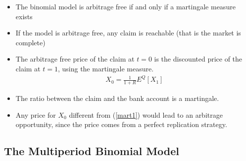 \documentclass[a4paper,10pt]{report}
\theoremstyle{plain}
\theoremstyle{definition}
\newcommand\be{\begin{eqnarray}}    %
\newcommand\ee{\end{eqnarray}}
\begin{document}
\begin{itemize}
\item The binomial model is arbitrage free if and only if a martingale measure exists
\item If the model is arbitrage free, any claim is reachable (that is the market is complete)
\item The arbitrage free price of the claim at $t=0$ is the discounted price of the claim at $t=1$, using the martingale measure. 
\be
X_0=\frac{1}{1+R}E^Q[X_1] 
\label{mart1}
\ee
\item The ratio between the claim and the bank account is a martingale.
\item Any price for $X_0$ different from (\ref{mart1}) would lead to an arbitrage opportunity, since the price comes from a perfect replication strategy.
\end{itemize}

\subsection{The Multiperiod Binomial Model}
\end{document}
